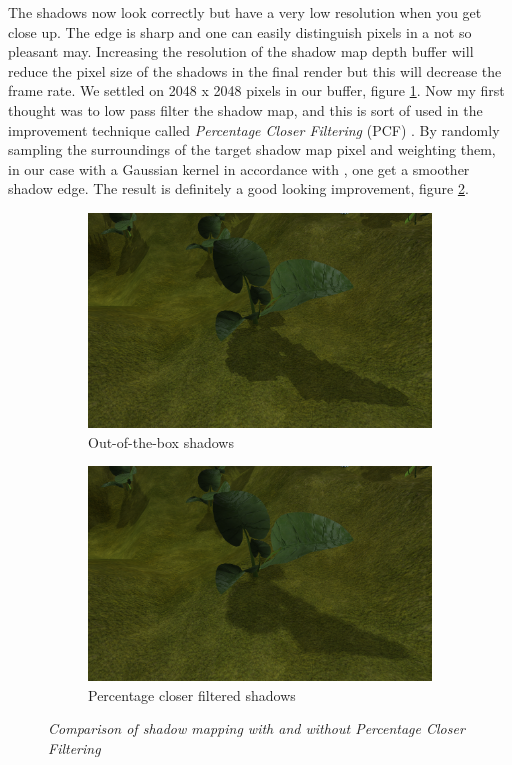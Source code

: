 The shadows now look correctly but have a very low resolution when you get close up. The edge is sharp and one can easily distinguish pixels in a not so pleasant may. Increasing the resolution of the shadow map depth buffer will reduce the pixel size of the shadows in the final render but this will decrease the frame rate. We settled on 2048 x 2048 pixels in our buffer, figure \ref{fig:PCFLvl1}. Now my first thought was to low pass filter the shadow map, and this is sort of used in the improvement technique called \textit{Percentage Closer Filtering} (PCF) \cite{ShadowMapAntialiasing87}\cite{ShadowMapAntialiasing03}. By randomly sampling the surroundings of the target shadow map pixel and weighting them, in our case with a Gaussian kernel in accordance with \cite{CascadeShadowMapping}, one get a smoother shadow edge. The result is definitely a good looking improvement, figure \ref{fig:PCFLvl5}. 

\begin{figure}[H]
\begin{subfigure}{.5\textwidth}
  \centering
  \includegraphics[width=0.9\linewidth]{images/PCFLvl1.jpg}
  \caption{Out-of-the-box shadows}
  \label{fig:PCFLvl1}
\end{subfigure}%
\begin{subfigure}{.5\textwidth}
  \centering
  \includegraphics[width=0.9\linewidth]{images/PCFLvl5.jpg}
  \caption{Percentage closer filtered shadows}
  \label{fig:PCFLvl5}
\end{subfigure}
\caption[Percentage Closer Filtering]{\textit{Comparison of shadow mapping with and without Percentage Closer Filtering}}
\label{fig:PCFComparison}
\end{figure}

